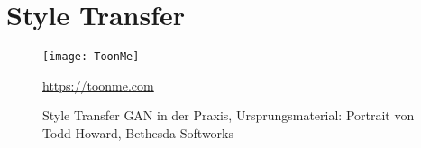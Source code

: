 \section{Style Transfer}


\begin{figure}[H]
    \centering
    \texttt{[image: ToonMe]}
    \caption{Style Transfer GAN in der Praxis, Ursprungsmaterial: Portrait von Todd Howard, Bethesda Softworks} \quelle\url{https://toonme.com}
\label{fig:deep_learning}
\end{figure}

\newpage
